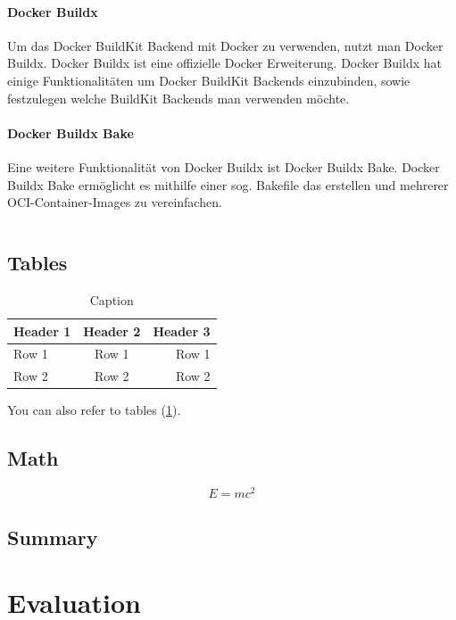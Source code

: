 \documentclass[
  12pt,
  a4paper,
  printlength,
  bibliography=totoc,
  chapterprefix,
  headings=openright,
  numbers=endperiod,
  parskip=half,
  twoside
]{scrreprt}
\begin{document}
\subsubsection{Docker Buildx}

Um das Docker BuildKit Backend mit Docker zu verwenden, nutzt man Docker Buildx. Docker Buildx ist eine offizielle Docker Erweiterung. Docker Buildx hat einige Funktionalitäten um Docker BuildKit Backends einzubinden, sowie festzulegen welche BuildKit Backends man verwenden möchte.

\subsubsection{Docker Buildx Bake}

Eine weitere Funktionalität von Docker Buildx ist Docker Buildx Bake. Docker Buildx Bake ermöglicht es mithilfe einer sog. Bakefile das erstellen und mehrerer OCI-Container-Images zu vereinfachen.

\inputminted{./lexers/docker-bake-lexer.py}{./code-examples/docker-bake.example.hcl}

\section{Tables}

\begin{table}[ht]
\centering
\begin{tabular}{|l|c|r|}
  \hline
  \textbf{Header 1} & \textbf{Header 2} & \textbf{Header 3} \\
  \hline
  \hline
  Row 1 & Row 1 & Row 1 \\
  Row 2 & Row 2 & Row 2 \\
  \hline
\end{tabular}
\caption{Caption}
\label{tab:table}
\end{table}

You can also refer to tables (\cref{tab:table}).

\section{Math}

\[
E = m c^2
\]

\section*{Summary}

\lipsum[2]

\chapter{Evaluation}
\label{cha:evaluation}
\end{document}
